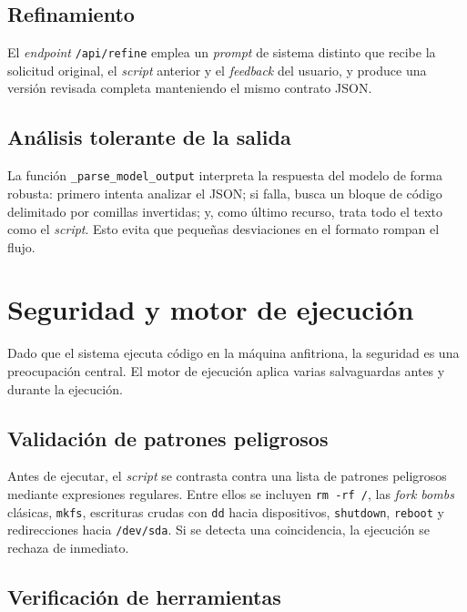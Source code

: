 \documentclass[12pt,a4paper]{article}
\begin{document}
\subsection{Refinamiento}

El \textit{endpoint} \texttt{/api/refine} emplea un \textit{prompt} de sistema
distinto que recibe la solicitud original, el \textit{script} anterior y el
\textit{feedback} del usuario, y produce una versión revisada completa
manteniendo el mismo contrato JSON.

\subsection{Análisis tolerante de la salida}

La función \texttt{\_parse\_model\_output} interpreta la respuesta del modelo de
forma robusta: primero intenta analizar el JSON; si falla, busca un bloque de
código delimitado por comillas invertidas; y, como último recurso, trata todo el
texto como el \textit{script}. Esto evita que pequeñas desviaciones en el
formato rompan el flujo.

\section{Seguridad y motor de ejecución}

Dado que el sistema ejecuta código en la máquina anfitriona, la seguridad es una
preocupación central. El motor de ejecución aplica varias salvaguardas antes y
durante la ejecución.

\subsection{Validación de patrones peligrosos}

Antes de ejecutar, el \textit{script} se contrasta contra una lista de patrones
peligrosos mediante expresiones regulares. Entre ellos se incluyen
\texttt{rm -rf /}, las \textit{fork bombs} clásicas, \texttt{mkfs}, escrituras
crudas con \texttt{dd} hacia dispositivos, \texttt{shutdown}, \texttt{reboot} y
redirecciones hacia \texttt{/dev/sda}. Si se detecta una coincidencia, la
ejecución se rechaza de inmediato.

\subsection{Verificación de herramientas}
\end{document}
